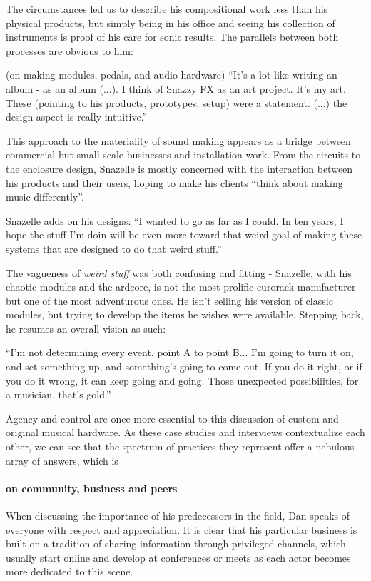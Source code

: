 The circumstances led us to describe his compositional work less than his physical products, but simply being in his office and seeing his collection of instruments is proof of his care for sonic results. The parallels between both processes are obvious to him: 

(on making modules, pedals, and audio hardware) ``It's a lot like writing an album - as an album (...). I think of Snazzy FX as an art project. It's my art. These (pointing to his products, prototypes, setup) were a statement. (...) the design aspect is really intuitive.''

This approach to the materiality of sound making appears as a bridge between commercial but small scale businesses and installation work. From the circuits to the enclosure design, Snazelle is mostly concerned with the interaction between his products and their users, hoping to make his clients ``think about making music differently''. 

Snazelle adds on his designs: ``I wanted to go as far as I could. In ten years, I hope the stuff I'm doin will be even more toward that weird goal of making these systems that are designed to do that weird stuff.''

The vagueness of \emph{weird stuff} was both confusing and fitting - Snazelle, with his chaotic modules and the ardcore, is not the most prolific eurorack manufacturer but one of the most adventurous ones. He isn't selling his version of classic modules, but trying to develop the items he wishes were available. Stepping back, he resumes an overall vision as such: 

``I'm not determining every event, point A to point B... I'm going to turn it on, and set something up, and something's going to come out. If you do it right, or if you do it wrong, it can keep going and going. Those unexpected possibilities, for a musician, that's gold.''

Agency and control are once more essential to this discussion of custom and original musical hardware. As these case studies and interviews contextualize each other, we can see that the spectrum of practices they represent offer a nebulous array of answers, which is 

\paragraph{on community, business and peers}

When discussing the importance of his predecessors in the field, Dan speaks of everyone with respect and appreciation. It is clear that his particular business is built on a tradition of sharing information through privileged channels, which usually start online and develop at conferences or meets as each actor becomes more dedicated to this scene. 

